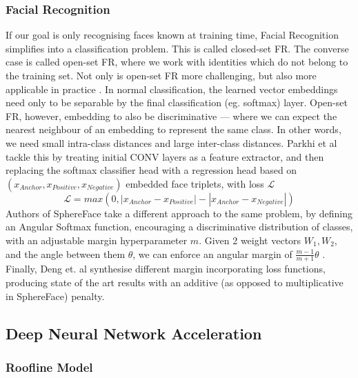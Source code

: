 \documentclass[12pt]{article}
\newcommand{\Loss}{\mathcal{L}}
\begin{document}
\subsubsection{Facial Recognition}
If our goal is only recognising faces known at training time, Facial Recognition simplifies
into a classification problem. This is called closed-set FR.
The converse case is called open-set FR, where we work with identities which do not belong to
the training set.
Not only is open-set FR more challenging, but also more applicable in practice
\cite{liu2017sphereface}.
In normal classification, the learned vector embeddings need only to be separable by the final
classification (eg. softmax) layer.
Open-set FR, however, embedding to also be discriminative --- where we can expect the nearest
neighbour of an embedding to represent the same class. In other words, we need small intra-class
distances and large inter-class distances\cite{deng2019arcface}.
Parkhi et al\cite{parkhi2015deep} tackle this by treating initial CONV layers as a feature
extractor, and then replacing the softmax classifier head with a regression head based on
$(x_{Anchor}, x_{Positive}, x_{Negative})$ embedded face triplets, with loss $\Loss$ $$\Loss =
max(0, |x_{Anchor} - x_{Positive}| - |x_{Anchor} - x_{Negative}|)$$
Authors of SphereFace\cite{liu2017sphereface} take a different approach to the same problem,
by defining an Angular Softmax function, encouraging a discriminative distribution of classes,
with an adjustable margin hyperparameter $m$.
Given 2 weight vectors $W_1, W_2$, and the angle between them $\theta$, we can enforce an
angular margin of $\frac{m-1}{m+1}\theta$ \cite{li2018angular}.
Finally, Deng et. al synthesise different margin incorporating loss functions, producing
state of the art results with an additive (as opposed to multiplicative in SphereFace)
penalty\cite{deng2019arcface}.

\subsection{Deep Neural Network Acceleration}
\subsubsection{Roofline Model}
\end{document}
